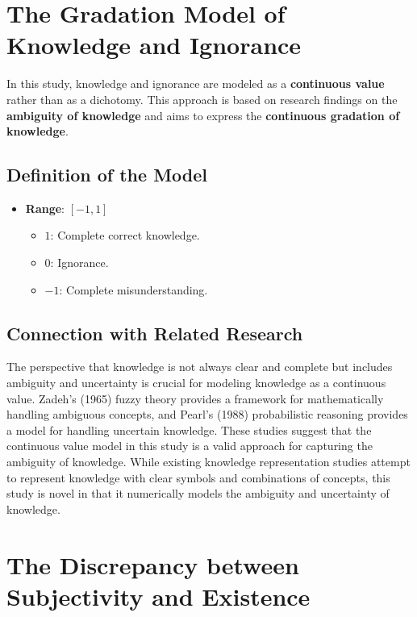 \documentclass{article}
\begin{document}
\section{The Gradation Model of Knowledge and Ignorance}

In this study, knowledge and ignorance are modeled as a \textbf{continuous value} rather than as a dichotomy. This approach is based on research findings on the \textbf{ambiguity of knowledge} and aims to express the \textbf{continuous gradation of knowledge}.

\subsection{Definition of the Model}

\begin{itemize}
    \item \textbf{Range}: \([-1, 1]\)
        \begin{itemize}
            \item \( 1 \): Complete correct knowledge.
            \item \( 0 \): Ignorance.
            \item \(-1 \): Complete misunderstanding.
        \end{itemize}
\end{itemize}

\subsection{Connection with Related Research}

The perspective that knowledge is not always clear and complete but includes ambiguity and uncertainty is crucial for modeling knowledge as a continuous value. Zadeh's (1965) fuzzy theory provides a framework for mathematically handling ambiguous concepts, and Pearl's (1988) probabilistic reasoning provides a model for handling uncertain knowledge. These studies suggest that the continuous value model in this study is a valid approach for capturing the ambiguity of knowledge. While existing knowledge representation studies attempt to represent knowledge with clear symbols and combinations of concepts, this study is novel in that it numerically models the ambiguity and uncertainty of knowledge.

\section{The Discrepancy between Subjectivity and Existence}
\end{document}
